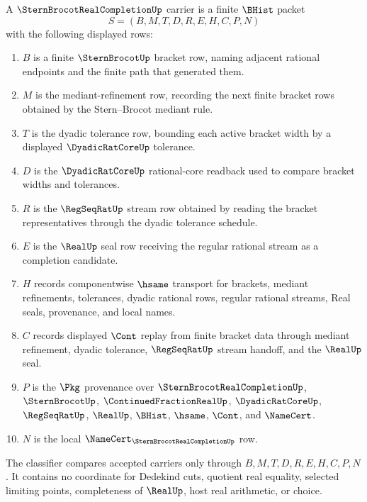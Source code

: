 \begin{definition}
\label{def:stern-brocot-real-completion-carrier}
A $\SternBrocotRealCompletionUp$ carrier is a finite $\BHist$ packet
$$
S=(B,M,T,D,R,E,H,C,P,N)
$$
with the following displayed rows:
\begin{enumerate}
\item $B$ is a finite $\SternBrocotUp$ bracket row, naming adjacent rational endpoints and the finite path that generated them.
\item $M$ is the mediant-refinement row, recording the next finite bracket rows obtained by the Stern--Brocot mediant rule.
\item $T$ is the dyadic tolerance row, bounding each active bracket width by a displayed $\DyadicRatCoreUp$ tolerance.
\item $D$ is the $\DyadicRatCoreUp$ rational-core readback used to compare bracket widths and tolerances.
\item $R$ is the $\RegSeqRatUp$ stream row obtained by reading the bracket representatives through the dyadic tolerance schedule.
\item $E$ is the $\RealUp$ seal row receiving the regular rational stream as a completion candidate.
\item $H$ records componentwise $\hsame$ transport for brackets, mediant refinements, tolerances, dyadic rational rows, regular rational streams, Real seals, provenance, and local names.
\item $C$ records displayed $\Cont$ replay from finite bracket data through mediant refinement, dyadic tolerance, $\RegSeqRatUp$ stream handoff, and the $\RealUp$ seal.
\item $P$ is the $\Pkg$ provenance over $\SternBrocotRealCompletionUp$, $\SternBrocotUp$, $\ContinuedFractionRealUp$, $\DyadicRatCoreUp$, $\RegSeqRatUp$, $\RealUp$, $\BHist$, $\hsame$, $\Cont$, and $\NameCert$.
\item $N$ is the local $\NameCert_{\SternBrocotRealCompletionUp}$ row.
\end{enumerate}
The classifier compares accepted carriers only through $B,M,T,D,R,E,H,C,P,N$. It contains no coordinate for Dedekind cuts, quotient real equality, selected limiting points, completeness of $\RealUp$, host real arithmetic, or choice.
\end{definition}

